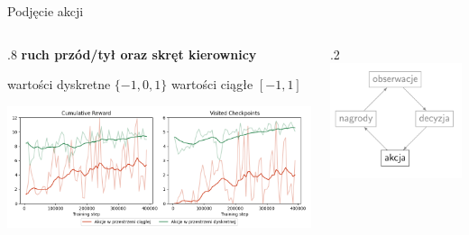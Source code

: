 \begin{frame}{Podjęcie akcji}
	
	\begin{columns}
		\begin{column}{.8\hsize}
			\textbf{ruch przód/tył oraz skręt kierownicy}
			\begin{itemize}
				\myitem wartości dyskretne $\{-1, 0, 1\}$
				\myitem wartości ciągłe $[-1, 1]$
			\end{itemize}
			
			\vspace{1cm}
			{\hspace*{7mm}\includegraphics[width=1.2\linewidth]{figures/output_actions.png}}
		\end{column}

		\begin{column}{.2\hsize}
			\includegraphics[width=\linewidth]{figures/learning_loop_3.png}
			\vspace{5cm}
		\end{column}
	\end{columns}
	
\end{frame}
